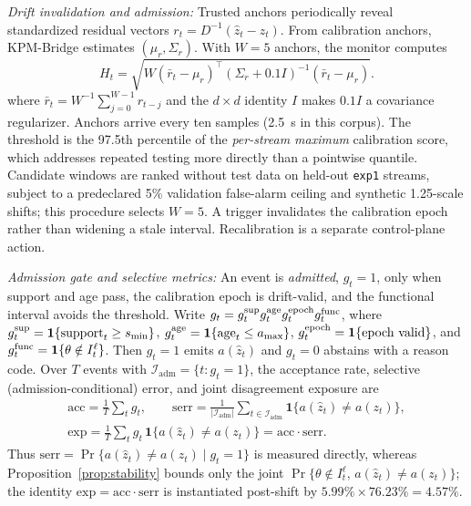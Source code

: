 \documentclass[10pt,journal,twoside]{IEEEtran}
\newcommand{\ind}{\mathbf{1}}
\begin{document}
\emph{Drift invalidation and admission:}
Trusted anchors periodically reveal standardized residual vectors $r_t=D^{-1}(\hat z_t-z_t)$. From calibration anchors, KPM-Bridge estimates $(\mu_r,\Sigma_r)$. With $W=5$ anchors, the monitor computes
\begin{equation}
H_t=\sqrt{W(\bar r_t-\mu_r)^\top(\Sigma_r+0.1I)^{-1}(\bar r_t-\mu_r)}.
\label{eq:drift-score}
\end{equation}
where $\bar r_t=W^{-1}\sum_{j=0}^{W-1}r_{t-j}$ and the $d\times d$ identity $I$ makes $0.1I$ a covariance regularizer. Anchors arrive every ten samples (2.5~s in this corpus). The threshold is the 97.5th percentile of the \emph{per-stream maximum} calibration score, which addresses repeated testing more directly than a pointwise quantile. Candidate windows are ranked without test data on held-out \texttt{exp1} streams, subject to a predeclared 5\% validation false-alarm ceiling and synthetic 1.25-scale shifts; this procedure selects $W=5$. A trigger invalidates the calibration epoch rather than widening a stale interval. Recalibration is a separate control-plane action.

\emph{Admission gate and selective metrics:}
An event is \emph{admitted}, $g_t=1$, only when support and age pass, the calibration epoch is drift-valid, and the functional interval avoids the threshold. Write $g_t=g_t^{\rm sup}g_t^{\rm age}g_t^{\rm epoch}g_t^{\rm func}$, where $g_t^{\rm sup}=\ind\{\operatorname{support}_t\ge s_{\min}\}$, $g_t^{\rm age}=\ind\{\operatorname{age}_t\le a_{\max}\}$, $g_t^{\rm epoch}=\ind\{\text{epoch valid}\}$, and $g_t^{\rm func}=\ind\{\theta\notin I_t^\ell\}$. Then $g_t=1$ emits $a(\hat z_t)$ and $g_t=0$ abstains with a reason code. Over $T$ events with $\mathcal I_{\mathrm{adm}}=\{t:g_t=1\}$, the acceptance rate, selective (admission-conditional) error, and joint disagreement exposure are
\begin{equation}
\begin{aligned}
\mathrm{acc}=\frac{1}{T}\sum_{t} g_t,\qquad
\mathrm{serr}=\frac{1}{|\mathcal I_{\mathrm{adm}}|}\sum_{t\in\mathcal I_{\mathrm{adm}}}\ind\{a(\hat z_t)\ne a(z_t)\},\\
\mathrm{exp}=\frac{1}{T}\sum_{t} g_t\,\ind\{a(\hat z_t)\ne a(z_t)\}=\mathrm{acc}\cdot\mathrm{serr}.
\end{aligned}
\label{eq:selective-metrics}
\end{equation}
Thus $\mathrm{serr}=\Pr\{a(\hat z_t)\ne a(z_t)\mid g_t=1\}$ is measured directly, whereas Proposition~\ref{prop:stability} bounds only the joint $\Pr\{\theta\notin I_t^\ell,\,a(\hat z_t)\ne a(z_t)\}$; the identity $\mathrm{exp}=\mathrm{acc}\cdot\mathrm{serr}$ is instantiated post-shift by $5.99\%\times76.23\%=4.57\%$.
\end{document}
